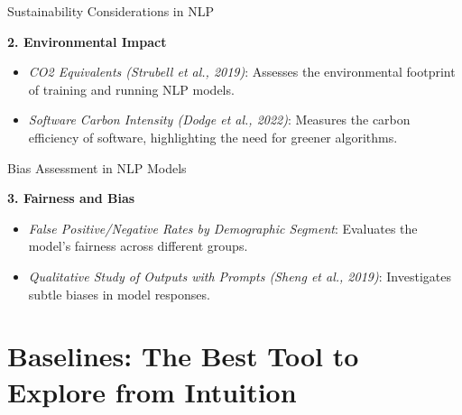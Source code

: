 \documentclass{beamer}
\begin{document}
\begin{frame}{Sustainability Considerations in NLP}

\textbf{2. Environmental Impact}
\begin{itemize}
  \item \textit{CO2 Equivalents (Strubell et al., 2019)}: Assesses the environmental footprint of training and running NLP models.
  \item \textit{Software Carbon Intensity (Dodge et al., 2022)}: Measures the carbon efficiency of software, highlighting the need for greener algorithms.
\end{itemize}

\end{frame}


\begin{frame}{Bias Assessment in NLP Models}

\textbf{3. Fairness and Bias}
\begin{itemize}
  \item \textit{False Positive/Negative Rates by Demographic Segment}: Evaluates the model's fairness across different groups.
  \item \textit{Qualitative Study of Outputs with Prompts (Sheng et al., 2019)}: Investigates subtle biases in model responses.
\end{itemize}

\end{frame}


\section{Baselines: The Best Tool to Explore from Intuition}
\end{document}
